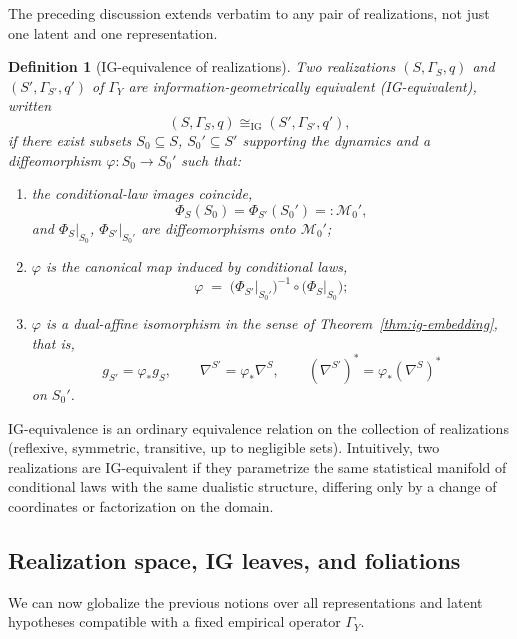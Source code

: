 \documentclass[11pt]{article}
\newtheorem{definition}{Definition}
\newcommand{\1}{\mathbf{1}}
\begin{document}
The preceding discussion extends verbatim to any pair of realizations, not just one latent and one representation.

\begin{definition}[IG-equivalence of realizations]
\label{def:ig-equivalence}
Two realizations $(S,\Gamma_S,q)$ and $(S',\Gamma_{S'},q')$ of $\Gamma_Y$ are \emph{information-geometrically equivalent} (IG-equivalent), written
\[
  (S,\Gamma_S,q) \cong_{\mathrm{IG}} (S',\Gamma_{S'},q'),
\]
if there exist subsets $S_0\subseteq S$, $S_0'\subseteq S'$ supporting the dynamics and a diffeomorphism $\varphi : S_0\to S_0'$ such that:
\begin{enumerate}[label=(I\arabic*),leftmargin=1.8em]
  \item the conditional-law images coincide,
        \[
          \Phi_S(S_0) = \Phi_{S'}(S_0') =: \mathcal{M}_0',
        \]
        and $\Phi_S|_{S_0}$, $\Phi_{S'}|_{S_0'}$ are diffeomorphisms onto $\mathcal{M}_0'$;
  \item $\varphi$ is the canonical map induced by conditional laws,
        \[
          \varphi
          \;=\;
          \bigl(\Phi_{S'}\big|_{S_0'}\bigr)^{-1}
          \circ
          \bigl(\Phi_S\big|_{S_0}\bigr);
        \]
  \item $\varphi$ is a dual-affine isomorphism in the sense of Theorem~\ref{thm:ig-embedding}, that is,
        \[
          g_{S'} = \varphi_\ast g_S,
          \qquad
          \nabla^{S'} = \varphi_\ast \nabla^S,
          \qquad
          (\nabla^{S'})^\ast = \varphi_\ast (\nabla^S)^\ast
        \]
        on $S_0'$.
\end{enumerate}
\end{definition}

IG-equivalence is an ordinary equivalence relation on the collection of realizations (reflexive, symmetric, transitive, up to negligible sets). Intuitively, two realizations are IG-equivalent if they parametrize the same statistical manifold of conditional laws with the same dualistic structure, differing only by a change of coordinates or factorization on the domain.

\subsection{Realization space, IG leaves, and foliations}
\label{subsec:ig-leaves}

We can now globalize the previous notions over all representations and latent hypotheses compatible with a fixed empirical operator $\Gamma_Y$.
\end{document}
